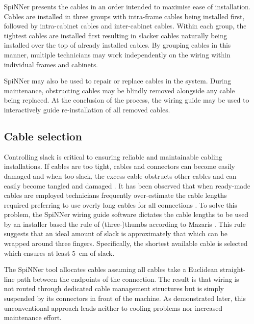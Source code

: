 			SpiNNer presents the cables in an order intended to maximise ease of
			installation. Cables are installed in three groups with intra-frame
			cables being installed first, followed by intra-cabinet cables and
			inter-cabinet cables. Within each group, the tightest cables are
			installed first resulting in slacker cables naturally being installed
			over the top of already installed cables. By grouping cables in this
			manner, multiple technicians may work independently on the wiring within
			individual frames and cabinets.
			
			SpiNNer may also be used to repair or replace cables in the system.
			During maintenance, obstructing cables may be blindly removed alongside
			any cable being replaced. At the conclusion of the process, the wiring
			guide may be used to interactively guide re-installation of all removed
			cables.
		
		\subsection{Cable selection}
			
			Controlling slack is critical to ensuring reliable and maintainable
			cabling installations. If cables are too tight, cables and connectors can
			become easily damaged and when too slack, the excess cable obstructs
			other cables and can easily become tangled and damaged \cite{cisco07}. It
			has been observed that when ready-made cables are employed technicians
			frequently over-estimate the cable lengths required preferring to use
			overly long cables for all connections \cite{mazaris97}. To solve this
			problem, the SpiNNer wiring guide software dictates the cable lengths to
			be used by an installer based the rule of (three-)thumbs according to
			Mazaris \cite{mazaris97}. This rule suggests that an ideal amount of
			slack is approximately that which can be wrapped around three fingers.
			Specifically, the shortest available cable is selected which ensures at
			least \SI{5}{\centi\meter} of slack.
			
			The SpiNNer tool allocates cables assuming all cables take a Euclidean
			straight-line path between the endpoints of the connection. The result is
			that wiring is not routed through dedicated cable management structures
			but is simply suspended by its connectors in front of the machine. As
			demonstrated later, this unconventional approach leads neither to cooling
			problems nor increased maintenance effort.
	

